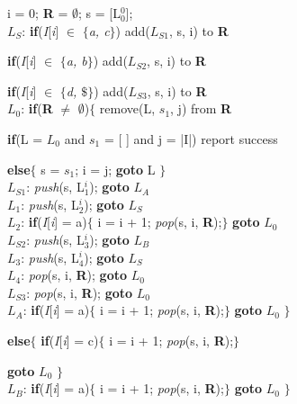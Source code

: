 \vspace{0.5cm}
\hspace{0.2cm}i = 0; \textbf{R} = $\emptyset$; s = [L$_0^{0}$];\\
$L_S$: \textbf{if}(\textit{I}[\textit{i}] $\in$ $\{$\textit{a, c}$\}$) add($L_{S1}$, s, i) to \textbf{R} \par
\hspace{0.4cm}\textbf{if}(\textit{I}[\textit{i}] $\in$ $\{$\textit{a, b}$\}$) add($L_{S2}$, s, i) to \textbf{R}\par
\hspace{0.4cm}\textbf{if}(\textit{I}[\textit{i}] $\in$ $\{$\textit{d, $\$$}$\}$) add($L_{S3}$, s, i) to \textbf{R} \\
$L_0$: \textbf{if}(\textbf{R} $\ne$ $\emptyset$)$\{$ remove(L, $s_1$, j) from \textbf{R} \par
\hspace{0.4cm}\textbf{if}(L = $L_0$ and $s_1$ = [ ] and j = |I|) report success \par
\hspace{0.4cm}\textbf{else}$\{$ s = $s_1$; i = j; \textbf{goto} L $\}$ \\
$L_{S1}$: \textit{push}(s, L$_1^{i}$); \textbf{goto} $L_A$\\
$L_1$:  \textit{push}(s, L$_2^{i}$); \textbf{goto} $L_S$\\
$L_2$:  \textbf{if}(\textit{I}[\textit{i}] = a)$\{$ i = i + 1; \textit{pop}(s, i, \textbf{R});$\}$ \textbf{goto} $L_0$ \\
$L_{S2}$: \textit{push}(s, L$_3^{i}$); \textbf{goto} $L_B$\\
$L_3$:  \textit{push}(s, L$_4^{i}$); \textbf{goto} $L_S$\\
$L_4$: \textit{pop}(s, i, \textbf{R}); \textbf{goto} $L_0$ \\
$L_{S3}$: \textit{pop}(s, i, \textbf{R}); \textbf{goto} $L_0$ \\
$L_A$:  \textbf{if}(\textit{I}[\textit{i}] = a)$\{$ i = i + 1; \textit{pop}(s, i, \textbf{R});$\}$ \textbf{goto} $L_0$ $\}$ \par
\hspace{0.2cm} \textbf{else}$\{$ \textbf{if}(\textit{I}[\textit{i}] = c)$\{$ i = i + 1; \textit{pop}(s, i, \textbf{R});$\}$ \par 
\hspace{1.5cm}\textbf{goto} $L_0$ $\}$ \\
$L_B$:  \textbf{if}(\textit{I}[\textit{i}] = a)$\{$ i = i + 1; \textit{pop}(s, i, \textbf{R});$\}$ \textbf{goto} $L_0$ $\}$ \par
